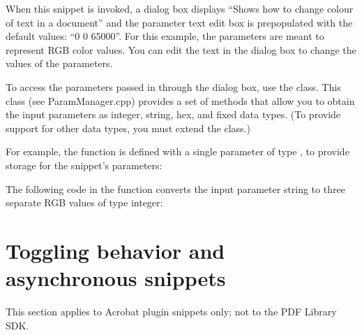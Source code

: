 \documentclass[letterpaper,12pt,english,openany,oneside]{sphinxmanual}
\begin{document}
When this snippet is invoked, a dialog box displays “Shows how to change colour of text in a document” and the parameter text edit box is pre\sphinxhyphen{}populated with the default values: “0 0 65000”. For this example, the parameters are meant to represent RGB color values. You can edit the text in the dialog box to change the values of the parameters.

To access the parameters passed in through the dialog box, use the  class. This class (see ParamManager.cpp) provides a set of methods that allow you to obtain the input parameters as integer, string, hex, and fixed data types. (To provide support for other data types, you must extend the  class.)

For example, the  function is defined with a single parameter of type  , to provide storage for the snippet’s parameters:

\begin{sphinxVerbatim}[commandchars=\\\{\}]
   
\end{sphinxVerbatim}

The following code in the  function converts the input parameter string to three separate RGB values of type integer:

\begin{sphinxVerbatim}[commandchars=\\\{\}]
 

\end{sphinxVerbatim}




\section{Toggling behavior and asynchronous snippets}
\label{\detokenize{Snippet_WritingSnippets:toggling-behavior-and-asynchronous-snippets}}
This section applies to Acrobat plug\sphinxhyphen{}in snippets only; not to the PDF Library SDK.
\end{document}
